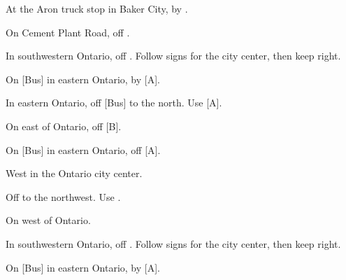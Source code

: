 

\begin{LocationList}

At the Aron truck stop in Baker City, by  .

On Cement Plant Road, off  .

In southwestern Ontario, off . Follow signs for the city center, then keep right.

\Location{\GarageHQ \Garage}
On [Bus] in eastern Ontario, by  [A].

In eastern Ontario, off [Bus] to the north. Use  [A].

On  east of Ontario, off  [B].

On [Bus] in eastern Ontario, off  [A].

\Location{\RecruitmentAgency \Recruitment}
West in the Ontario city center.

Off  to the northwest. Use  .

On  west of Ontario.

In southwestern Ontario, off .
Follow signs for the city center, then keep right.

\Location{\TruckStop \Gas \Rest \Service \Weigh}
On [Bus] in eastern Ontario, by  [A].

\end{LocationList}
